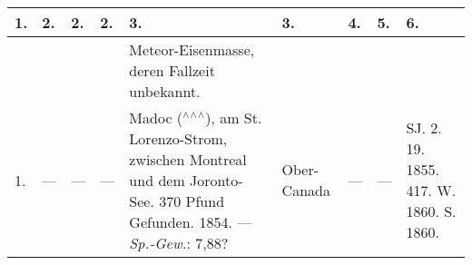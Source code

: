 \documentclass[a4paper, 8pt, oneside, polutonikogreek, german]{article}
\begin{document}
\subsubsection{}
\begin{table}[H]
    \centering
    \frakfamily
    \footnotesize
    \begin{longtable}{|p{3mm}|p{4mm}|p{11mm}|p{7mm}|p{22mm}|p{14mm}|p{10mm}|p{10mm}|p{13mm}|}
    \hline
        1. & 2. & 2. & 2. & 3. & 3. & 4. & 5. & 6. \\ \hline
          &   &   &   & Meteor-Eisenmasse, deren Fallzeit unbekannt. &   &   &   &   \\ \hline
        1. & --- & --- & --- & Madoc ($^\wedge$$^\wedge$$^\wedge$), am St. Lorenzo-Strom, zwischen Montreal und dem Joronto-See. 370 Pfund Gefunden. 1854. --- \emph{Sp.-Gew.}: 7,88? & Ober-Canada & --- & --- & SJ. 2. 19. 1855. 417. W. 1860. S. 1860. \\ \hline
    \end{longtable}
\end{table}
\end{document}
